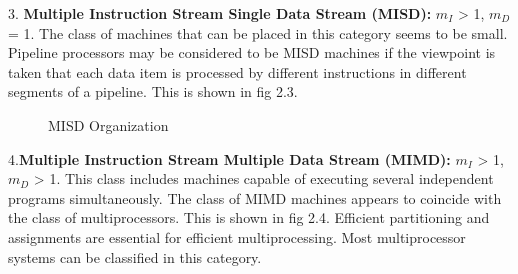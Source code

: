 3. {\bf{ Multiple Instruction Stream Single Data Stream (MISD):}} $m_{I}$ > 1, $m_{D}$ = 1. The class of machines that can be placed in this category seems
to be small. Pipeline processors may be considered to be MISD machines if the viewpoint is taken that each data item is processed by different instructions
in different segments of a pipeline. This is shown in fig 2.3.

\begin{figure}[ht]
{\centering {} \par}
\caption{MISD Organization}
\end{figure}

4.{\bf{Multiple Instruction Stream Multiple Data Stream (MIMD):}} $m_{I}$ > 1, $m_{D}$ > 1. This class includes machines capable of executing several
independent programs simultaneously. The class of MIMD machines appears to coincide with the class of multiprocessors. This is shown in fig 2.4. Efficient
partitioning and assignments are essential for efficient multiprocessing. Most multiprocessor systems can be classified in this category. 

